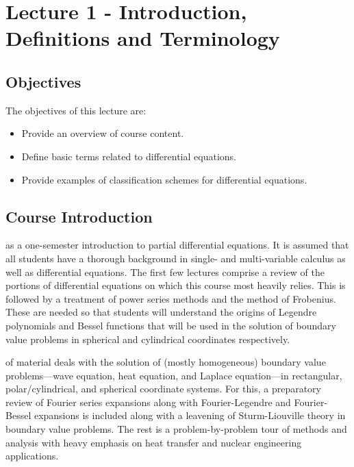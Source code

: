 \chapter{Lecture 1 - Introduction, Definitions and Terminology}
\label{ch:lec1}%
\section{Objectives}
The objectives of this lecture are:
\begin{itemize}
\item Provide an overview of course content.
\item Define basic terms related to differential equations.
\item Provide examples of classification schemes for differential equations.
\end{itemize}

\section{Course Introduction}
 as a one-semester introduction to partial differential equations.  It is assumed that all students have a thorough background in single- and multi-variable calculus as well as differential equations.  The first few lectures comprise a review of the portions of differential equations on which this course most heavily relies.  This is followed by a treatment of power series methods and the method of Frobenius.  These are needed so that students will understand the origins of Legendre polynomials and Bessel functions that will be used in the solution of boundary value problems in spherical and cylindrical coordinates respectively.

 of material deals with the solution of (mostly homogeneous) boundary value problems---wave equation, heat equation, and Laplace equation---in rectangular, polar/cylindrical, and spherical coordinate systems.  For this, a preparatory review of Fourier series expansions along with Fourier-Legendre and Fourier-Bessel expansions is included  along with a leavening of Sturm-Liouville theory in boundary value problems.  The rest is a problem-by-problem tour of methods and analysis with heavy emphasis on heat transfer and nuclear engineering applications.

